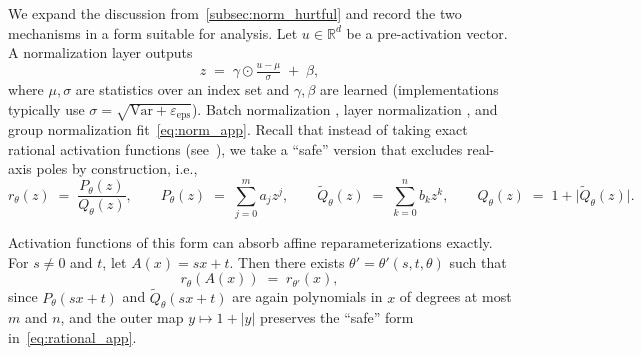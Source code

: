 \documentclass{article}
\theoremstyle{plain}
\theoremstyle{definition}
\theoremstyle{remark}
\begin{document}
We expand the discussion from~\cref{subsec:norm_hurtful} and record the two mechanisms in a form suitable for analysis. Let $u\in\mathbb{R}^d$ be a pre-activation vector. A normalization layer outputs
\begin{equation}
z \;=\; \gamma \odot \tfrac{u-\mu}{\sigma} \;+\; \beta,
\label{eq:norm_app}
\end{equation}
where $\mu,\sigma$ are statistics over an index set and $\gamma,\beta$ are learned (implementations typically use $\sigma=\sqrt{\mathrm{Var}+\varepsilon_{\mathrm{eps}}}$). Batch normalization \citep{ioffe2015batch}, layer normalization \citep{ba2016layer}, and group normalization \citep{wu2018group} fit~\cref{eq:norm_app}. Recall that instead of taking exact rational activation functions (see~\citep{boulle2020rational}), we take a ``safe'' version that excludes real-axis poles by construction, i.e., 
\begin{equation}
r_\theta(z) \;=\; \frac{P_\theta(z)}{Q_\theta(z)},
\qquad P_\theta(z) \;=\; \sum_{j=0}^{m} a_j z^j,\qquad
\widetilde{Q}_\theta(z) \;=\; \sum_{k=0}^{n} b_k z^k,\qquad
Q_\theta(z) \;=\; 1+\bigl|\widetilde{Q}_\theta(z)\bigr| .
\label{eq:rational_app}
\end{equation}

Activation functions of this form can absorb affine reparameterizations exactly. For $s\neq 0$ and $t$, let $A(x)=sx+t$. Then there exists $\theta'=\theta'(s,t,\theta)$ such that
\begin{equation}
r_\theta(A(x)) \;=\; r_{\theta'}(x),
\label{eq:affine_absorb_app}
\end{equation}
since $P_\theta(sx+t)$ and $\widetilde{Q}_\theta(sx+t)$ are again polynomials in $x$ of degrees at most $m$ and $n$, and the outer map $y\mapsto 1+|y|$ preserves the ``safe'' form in~\cref{eq:rational_app}. %
\end{document}
